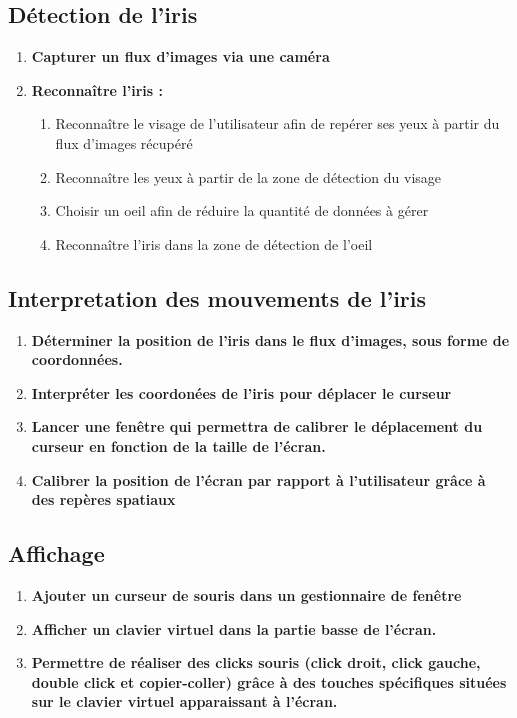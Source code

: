 \documentclass[a4paper, 12pt]{report}
\begin{document}
        \subsection{Détection de l'iris}
\begin{enumerate}
\item \textbf{Capturer un flux d'images via une caméra }
\item \textbf{Reconnaître l'iris :}
\begin{enumerate}
\item Reconnaître le visage de l'utilisateur afin de repérer ses yeux à partir du flux d'images récupéré 
\item Reconnaître les yeux à partir de la zone de détection du visage
\item Choisir un oeil afin de réduire la quantité de données à gérer
\item Reconnaître l'iris dans la zone de détection de l'oeil
\end{enumerate}
\end{enumerate}
		\subsection{Interpretation des mouvements de l'iris}
\begin{enumerate}
\item \textbf{Déterminer la position de l'iris dans le flux d'images, sous forme de coordonnées.}
\item \textbf{Interpréter les coordonées de l'iris pour déplacer le curseur}
\item \textbf{Lancer une fenêtre qui permettra de calibrer le déplacement du curseur en fonction de la taille de l'écran.}
\item \textbf{Calibrer la position de l'écran par rapport à l'utilisateur grâce à des repères spatiaux}
\end{enumerate}
		\subsection{Affichage}
\begin{enumerate}
\item \textbf{Ajouter un curseur de souris dans un gestionnaire de fenêtre }
\item \textbf{Afficher un clavier virtuel dans la partie basse de l'écran.}
\item \textbf{Permettre de réaliser des clicks souris (click droit, click gauche, double click et copier-coller) grâce à des touches spécifiques situées sur le clavier virtuel apparaissant à l'écran.}

\end{enumerate}
\end{document}
